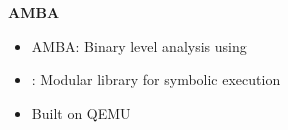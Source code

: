 \begin{frame}

	\begin{columns}[t]
		\begin{column}{0.6\textwidth}
			\textbf{AMBA}
			\small
			\begin{itemize}
				\item AMBA: Binary level analysis using \stoe{}
				\item \stoe{}: Modular library for symbolic execution
				\item Built on QEMU
			\end{itemize}
		\end{column}
	\end{columns}
\end{frame}
